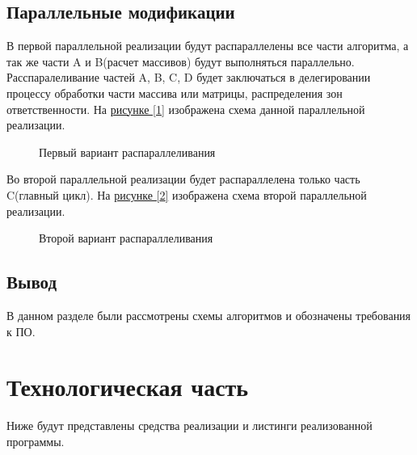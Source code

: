 \documentclass{article}
\begin{document}
		\subsection{Параллельные модификации}
		В первой параллельной реализации будут распараллелены все части алгоритма, а так же части A и B(расчет массивов) будут выполняться параллельно. Расспаралеливание частей A, B, C, D будет заключаться в делегировании процессу обработки части массива или матрицы, распределения зон ответственности. На \hyperref[firstParallel]{рисунке  [\ref{firstParallel}]} изображена схема данной параллельной реализации.
\begin{figure}[h!]
		\caption{Первый вариант распараллеливания}
		\label{firstParallel}
	\end{figure}
\newline
		\indent Во второй параллельной реализации будет распараллелена только часть C(главный цикл). На \hyperref[secondParallel]{рисунке  [\ref{secondParallel}]} изображена схема второй параллельной реализации.
\begin{figure}[h!]
		\caption{Второй вариант распараллеливания}
		\label{secondParallel}
	\end{figure}
	\subsection{Вывод}
	В данном разделе были рассмотрены схемы алгоритмов и обозначены требования к ПО.
	
	\newpage
	\section{Технологическая часть}
	Ниже будут представлены средства реализации и листинги реализованной программы.
\end{document}
